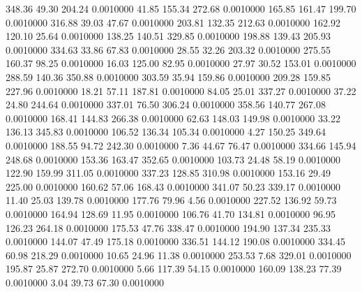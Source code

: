  348.36   49.30  204.24   0.0010000
  41.85  155.34  272.68   0.0010000
 165.85  161.47  199.70   0.0010000
 316.88   39.03   47.67   0.0010000
 203.81  132.35  212.63   0.0010000
 162.92  120.10   25.64   0.0010000
 138.25  140.51  329.85   0.0010000
 198.88  139.43  205.93   0.0010000
 334.63   33.86   67.83   0.0010000
  28.55   32.26  203.32   0.0010000
 275.55  160.37   98.25   0.0010000
  16.03  125.00   82.95   0.0010000
  27.97   30.52  153.01   0.0010000
 288.59  140.36  350.88   0.0010000
 303.59   35.94  159.86   0.0010000
 209.28  159.85  227.96   0.0010000
  18.21   57.11  187.81   0.0010000
  84.05   25.01  337.27   0.0010000
  37.22   24.80  244.64   0.0010000
 337.01   76.50  306.24   0.0010000
 358.56  140.77  267.08   0.0010000
 168.41  144.83  266.38   0.0010000
  62.63  148.03  149.98   0.0010000
  33.22  136.13  345.83   0.0010000
 106.52  136.34  105.34   0.0010000
   4.27  150.25  349.64   0.0010000
 188.55   94.72  242.30   0.0010000
   7.36   44.67   76.47   0.0010000
 334.66  145.94  248.68   0.0010000
 153.36  163.47  352.65   0.0010000
 103.73   24.48   58.19   0.0010000
 122.90  159.99  311.05   0.0010000
 337.23  128.85  310.98   0.0010000
 153.16   29.49  225.00   0.0010000
 160.62   57.06  168.43   0.0010000
 341.07   50.23  339.17   0.0010000
  11.40   25.03  139.78   0.0010000
 177.76   79.96    4.56   0.0010000
 227.52  136.92   59.73   0.0010000
 164.94  128.69   11.95   0.0010000
 106.76   41.70  134.81   0.0010000
  96.95  126.23  264.18   0.0010000
 175.53   47.76  338.47   0.0010000
 194.90  137.34  235.33   0.0010000
 144.07   47.49  175.18   0.0010000
 336.51  144.12  190.08   0.0010000
 334.45   60.98  218.29   0.0010000
  10.65   24.96   11.38   0.0010000
 253.53    7.68  329.01   0.0010000
 195.87   25.87  272.70   0.0010000
   5.66  117.39   54.15   0.0010000
 160.09  138.23   77.39   0.0010000
   3.04   39.73   67.30   0.0010000
